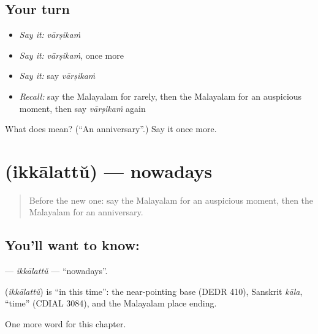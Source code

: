\subsection*{Your turn}
\begin{itemize}
\raggedright
  \item \emph{Say it:} \emph{vārṣikaṁ}
  \item \emph{Say it:} \emph{vārṣikaṁ}, once more
  \item \emph{Say it:} say \emph{vārṣikaṁ}
  \item \emph{Recall:} say the Malayalam for rarely, then the Malayalam for an auspicious moment, then say \emph{vārṣikaṁ} again
\end{itemize}

\begin{tcolorbox}[breakable,colback=teal!4,colframe=teal!35!black,title={Before you move on}]
What does  mean? (\textquotedblleft{}An anniversary\textquotedblright{}.) Say it once more.
\end{tcolorbox}
\section[\texorpdfstring{\ml{ഇക്കാലത്ത്} (ikkālattŭ)}{ഇക്കാലത്ത് (ikkālattŭ)}]{ (ikkālattŭ) — nowadays}

\label{lesson:ML-C277-ikkalattu}



\begin{quote}
Before the new one: say the Malayalam for an auspicious moment, then the Malayalam for an anniversary.
\end{quote}

\subsection*{You'll want to know: }
\textbf{} — \emph{ikkālattŭ} — \textquotedblleft{}nowadays\textquotedblright{}.

\begin{cousinweb}
\textbf{} (\emph{ikkālattŭ}) is \textquotedblleft{}in this time\textquotedblright{}: the near-pointing base (DEDR 410), Sanskrit \emph{kāla}, \textquotedblleft{}time\textquotedblright{} (CDIAL 3084), and the Malayalam place ending.
\end{cousinweb}

\begin{grammarlens}[title={What you've built}]
One more word for this chapter.
\end{grammarlens}

